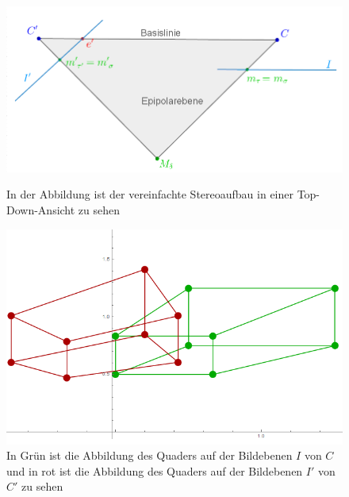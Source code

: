 
\begin{figure}[!htb]
	\includegraphics[width=\linewidth]{images/SynthetischesBeispielAufbauTopDown_beschriftet.png}
	\caption{In der Abbildung ist der vereinfachte Stereoaufbau in einer Top-Down-Ansicht zu sehen}
	\label{fig:aufbauMinimalTopDown}
	\endminipage\hfill
	\includegraphics[width=\linewidth]{images/QuadrateMinimalBeispiel.png}
	\caption{In Grün ist die Abbildung des Quaders auf der Bildebenen $I$ von $C$ und in rot ist die Abbildung des Quaders auf der Bildebenen $I'$ von $C'$ zu sehen}
	\label{fig:AbbildungenMinimal}
	\endminipage\hfill
\end{figure}

